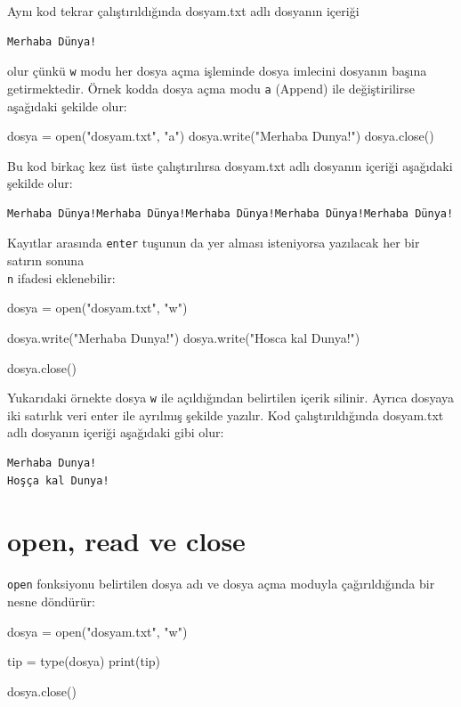\documentclass[12pt]{report}
\begin{document}
Aynı kod tekrar çalıştırıldığında dosyam.txt adlı dosyanın içeriği 

\begin{verbatim}
Merhaba Dünya!
\end{verbatim}

olur çünkü \texttt{w} modu her dosya açma işleminde dosya imlecini dosyanın başına getirmektedir. Örnek kodda dosya açma modu \texttt{a} (Append) ile değiştirilirse aşağıdaki şekilde olur:

\begin{python}
	dosya = open("dosyam.txt", "a")
	dosya.write("Merhaba Dunya!")
	dosya.close()
\end{python}

Bu kod birkaç kez üst üste çalıştırılırsa dosyam.txt adlı dosyanın içeriği aşağıdaki şekilde olur:

\begin{verbatim}
Merhaba Dünya!Merhaba Dünya!Merhaba Dünya!Merhaba Dünya!Merhaba Dünya!
\end{verbatim}

Kayıtlar arasında \texttt{enter} tuşunun da yer alması isteniyorsa yazılacak her bir satırın sonuna \texttt{\\n} ifadesi eklenebilir:

\begin{python}
dosya = open("dosyam.txt", "w")

dosya.write("Merhaba Dunya!\n")
dosya.write("Hosca kal Dunya!\n")

dosya.close()
\end{python}

Yukarıdaki örnekte dosya \texttt{w} ile açıldığından belirtilen içerik silinir. Ayrıca dosyaya iki satırlık veri enter ile ayrılmış şekilde yazılır. Kod çalıştırıldığında dosyam.txt adlı dosyanın içeriği aşağıdaki gibi olur:

\begin{verbatim}
Merhaba Dunya!
Hoşça kal Dunya!
\end{verbatim}


\section{open, read ve close}
\texttt{open} fonksiyonu belirtilen dosya adı ve dosya açma moduyla çağırıldığında bir nesne döndürür:

\begin{python}
dosya = open("dosyam.txt", "w")

tip = type(dosya)
print(tip)

dosya.close()
\end{python}
\end{document}
